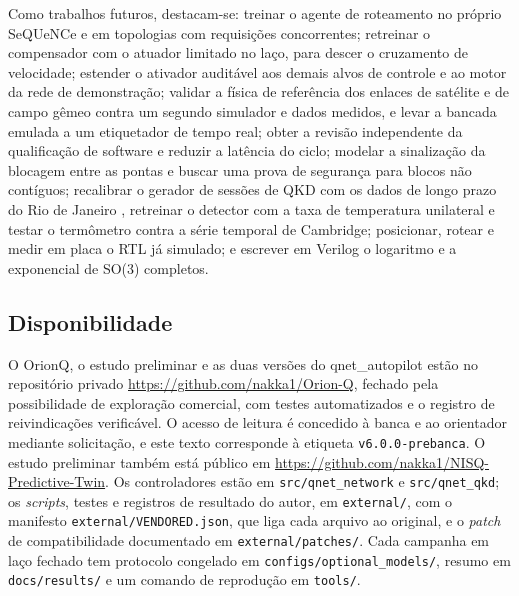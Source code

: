 \documentclass[12pt]{article}
\begin{document}
Como trabalhos futuros, destacam-se: treinar o agente de roteamento no próprio
SeQUeNCe e em topologias com requisições concorrentes;
retreinar o compensador com o atuador limitado no laço, para descer o
cruzamento de velocidade; estender o ativador auditável aos demais alvos de
controle e ao motor da rede de demonstração; validar a física de referência dos
enlaces de satélite e de campo gêmeo contra um segundo simulador e dados medidos,
e levar a bancada emulada a um etiquetador de tempo real; obter a revisão
independente da qualificação de software e reduzir a latência do ciclo; modelar a sinalização da blocagem entre as pontas e
buscar uma prova de segurança para blocos não contíguos; recalibrar o gerador de
sessões de QKD com os dados de longo prazo do Rio de Janeiro \cite{tezzin2026},
retreinar o detector com a taxa de temperatura unilateral e
testar o termômetro contra a série temporal de Cambridge; posicionar, rotear e
medir em placa o RTL já simulado; e escrever em Verilog o logaritmo e a
exponencial de SO(3) completos.

\subsection*{Disponibilidade}

O OrionQ, o estudo preliminar e as duas versões do qnet\_autopilot estão no
repositório privado \url{https://github.com/nakka1/Orion-Q}, fechado pela
possibilidade de exploração comercial, com testes automatizados e o registro de
reivindicações verificável. O acesso de leitura é concedido à banca e ao
orientador mediante solicitação, e este texto corresponde à etiqueta
\texttt{v6.0.0-prebanca}. O estudo preliminar também está público em
\url{https://github.com/nakka1/NISQ-Predictive-Twin}. Os controladores estão
em \texttt{src/qnet\_network} e \texttt{src/qnet\_qkd}; os \textit{scripts}, testes
e registros de resultado do autor, em \texttt{external/}, com o manifesto
\texttt{external/VENDORED.json}, que liga cada arquivo ao original, e o
\textit{patch} de compatibilidade documentado em \texttt{external/patches/}. Cada campanha
em laço fechado tem protocolo congelado em \texttt{configs/optional\_models/},
resumo em \texttt{docs/results/} e um comando de reprodução em \texttt{tools/}.




\end{document}
